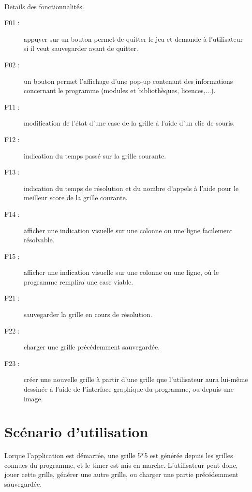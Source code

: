\paragraph*{}
Details des fonctionnalités.
\begin{description}
\item[F01 :] appuyer sur un bouton permet de quitter le jeu et demande à l'utilisateur si il veut sauvegarder avant de quitter.

\item[F02 :] un bouton permet l'affichage d'une pop-up contenant des informations concernant le programme (modules et bibliothèques, licences,...).

\item[F11 :] modification de l'état d'une case de la grille à l'aide d'un clic de souris.

\item[F12 :] indication du temps passé sur la grille courante.

\item[F13 :] indication du temps de résolution et du nombre d'appels à l'aide pour le meilleur score de la grille courante.

\item[F14 :] afficher une indication visuelle sur une colonne ou une ligne facilement résolvable. %

\item[F15 :] afficher une indication visuelle sur une colonne ou une ligne, où le programme remplira une case viable.

\item[F21 :] sauvegarder la grille en cours de résolution.

\item[F22 :] charger une grille précédemment sauvegardée.

\item[F23 :] créer une nouvelle grille  à partir d'une grille que l'utilisateur aura lui-même dessinée à l'aide  de l'interface graphique du programme, ou depuis une image.

\end{description}


\section{Scénario d'utilisation}
\paragraph*{}
Lorque l'application est démarrée, une grille 5*5 est générée depuis les grilles connues du programme, et le timer est mis en marche. L'utilisateur peut donc, jouer cette grille, générer une autre grille, ou charger une partie précédemment sauvegardée.
